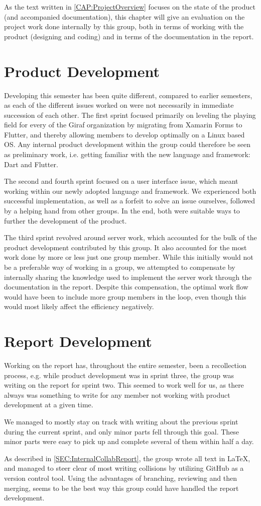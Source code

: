 As the text written in \autoref{CAP:ProjectOverview} focuses on the state of the product (and accompanied documentation), this chapter will give an evaluation on the project work done internally by this group, both in terms of working with the product (designing and coding) and in terms of the documentation in the report.

\section{Product Development}
Developing this semester has been quite different, compared to earlier semesters, as each of the different issues worked on were not necessarily in immediate succession of each other.
The first sprint focused primarily on leveling the playing field for every of the Giraf organization by migrating from Xamarin Forms to Flutter, and thereby allowing members to develop optimally on a Linux based OS.
Any internal product development within the group could therefore be seen as preliminary work, i.e. getting familiar with the new language and framework: Dart and Flutter.


The second and fourth sprint focused on a user interface issue, which meant working within our newly adopted language and framework.
We experienced both successful implementation, as well as a forfeit to solve an issue ourselves, followed by a helping hand from other groups.
In the end, both were suitable ways to further the development of the product.

The third sprint revolved around server work, which accounted for the bulk of the product development contributed by this group.
It also accounted for the most work done by more or less just one group member.
While this initially would not be a preferable way of working in a group, we attempted to compensate by internally sharing the knowledge used to implement the server work through the documentation in the report.
Despite this compensation, the optimal work flow would have been to include more group members in the loop, even though this would most likely affect the efficiency negatively.

\section{Report Development}
Working on the report has, throughout the entire semester, been a recollection process, e.g. while product development was in sprint three, the group was writing on the report for sprint two.
This seemed to work well for us, as there always was something to write for any member not working with product development at a given time.

We managed to mostly stay on track with writing about the previous sprint during the current sprint, and only minor parts fell through this goal.
These minor parts were easy to pick up and complete several of them within half a day.

As described in \autoref{SEC:InternalCollabReport}, the group wrote all text in \LaTeX, and managed to steer clear of most writing collisions by utilizing GitHub as a version control tool.
Using the advantages of branching, reviewing and then merging, seems to be the best way this group could have handled the report development.
